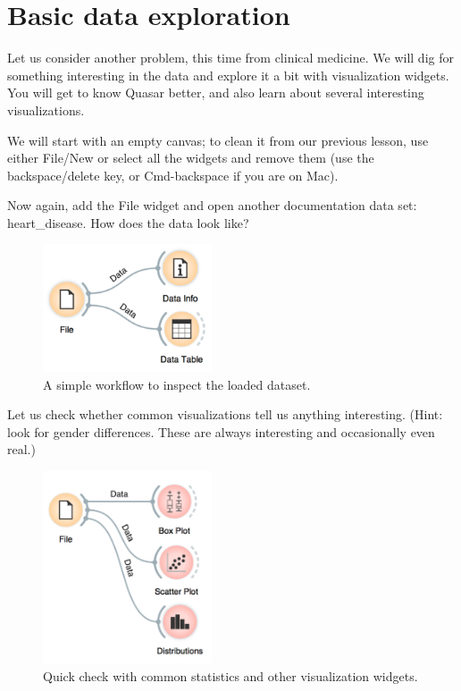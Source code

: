 \chapter{Basic data exploration}
\label{ch:basic_data_exploration}

 Let us consider another problem, this time from clinical medicine. We will dig for something interesting in the data and explore it a bit with visualization widgets. You will get to know Quasar better, and also learn about several interesting visualizations.

We will start with an empty canvas; to clean it from our previous lesson, use either File/New or select all the widgets and remove them (use the backspace/delete key, or Cmd-backspace if you are on Mac).

Now again, add the File widget and open another documentation data set: heart\_disease. How does the data look like?

\begin{figure}[h]
  \centering
  \includegraphics[width=50mm]{graphics/ch-basic_data_exploration/basic_data_exploration-fig1.png}%
  \caption{A simple workflow to inspect the loaded dataset.}
  \label{fig:basic_data_exploration-fig1}
\end{figure}

Let us check whether common visualizations tell us anything interesting. (Hint: look for gender differences. These are always interesting and occasionally even real.)

\begin{figure}[h]
  \centering
  \includegraphics[width=50mm]{graphics/ch-basic_data_exploration/basic_data_exploration-fig2.png}%
  \caption{Quick check with common statistics and other visualization widgets.}
  \label{fig:basic_data_exploration-fig2}
\end{figure}

